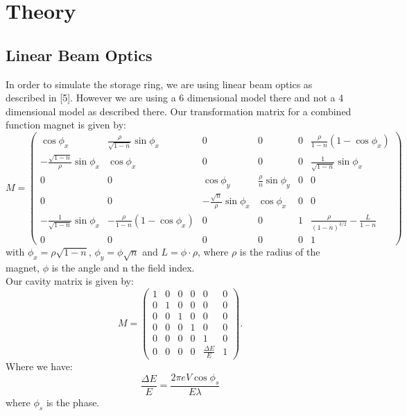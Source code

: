 \section{Theory}
\subsection{Linear Beam Optics}
In order to simulate the storage ring, we are using linear beam optics as described in [5]. However we are using a 6 dimensional model there and not a 4 dimensional model as described there. Our transformation matrix for a combined function magnet is given by:
\begin{equation} M = \left( \begin{array}{cccccc}
\cos \phi_x & \frac \rho {\sqrt{1 - n}} \sin \phi_x & 0 & 0 & 0 & \frac \rho {1 - n} (1 - \cos \phi_x) \\
- \frac{\sqrt{1 - n}} \rho \sin \phi_x & \cos \phi_x & 0 & 0 & 0 & \frac 1 {\sqrt{1 - n}} \sin \phi_x \\
0 & 0 & \cos \phi_y & \frac \rho n \sin \phi_y & 0 & 0 \\
0 & 0 & - \frac {\sqrt n} \rho \sin \phi_x & \cos \phi_x & 0 & 0 \\
- \frac 1 {\sqrt{1 - n}} \sin \phi_x & - \frac \rho {1- n } (1 - \cos \phi_x) & 0 & 0 & 1 & \frac \rho {(1 - n)^{3/2}} - \frac L {1 - n} \\
0 & 0 & 0 & 0 & 0 & 1 \end{array} \right) \end{equation}
with $\phi_x = \rho \sqrt{1 - n}$, $\phi_y = \phi \sqrt n$ and $L = \phi \cdot \rho$, where $\rho$ is the radius of the magnet, $\phi$ is the angle and n the field index.\\
Our cavity matrix is given by:
\begin{equation} M = \left( \begin{array}{cccccc}
1 & 0 & 0 & 0 & 0 & 0 \\
0 & 1 & 0 & 0 & 0 & 0 \\
0 & 0 & 1 & 0 & 0 & 0 \\
0 & 0 & 0 & 1 & 0 & 0 \\
0 & 0 & 0 & 0 & 1 & 0 \\
0 & 0 & 0 & 0 & \frac {\Delta E} E & 1 
\end{array} \right). \end{equation}
Where we have:
\begin{equation} \frac{\Delta E} E = \frac{2 \pi e V \cos \phi_s}{E \lambda} \end{equation}
where $\phi_s$ is the phase.
